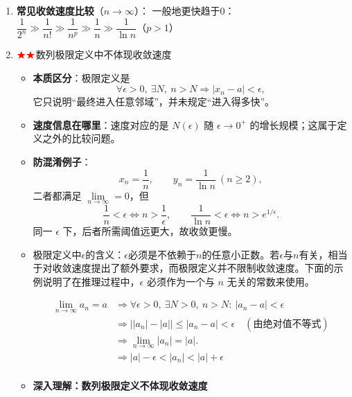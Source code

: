 \documentclass[../book.tex]{subfiles}
\begin{document}
\begin{enumerate}
        \item \textbf{常见收敛速度比较}（$n\to\infty$）：
        一般地更快趋于$0$：$\dfrac{1}{2^n} \gg \dfrac{1}{n!} \gg \dfrac{1}{n^p} \gg \dfrac{1}{n} \gg \dfrac{1}{\ln n}$（$p > 1$）
        \item $\color{red}{\bigstar}\color{red}{\bigstar}$数列极限定义中不体现收敛速度
        \begin{itemize}
            \item \textbf{本质区分}：极限定义是
            \[
                \forall \epsilon>0,\ \exists N,\ n>N\Rightarrow |x_n-a|<\epsilon,
            \]
            它只说明“最终进入任意邻域”，并未规定“进入得多快”。
            \item \textbf{速度信息在哪里}：速度对应的是 $N(\epsilon)$ 随 $\epsilon\to0^+$ 的增长规模；这属于定义之外的比较问题。
            \item \textbf{防混淆例子}：
            \[
                x_n=\frac1n,\qquad y_n=\frac1{\ln n}\ (n\ge2),
            \]
            二者都满足 $\lim\limits_{n\to\infty}=0$，但
            \[
                \frac1n<\epsilon \iff n>\frac1\epsilon,\qquad
                \frac1{\ln n}<\epsilon \iff n>e^{1/\epsilon}.
            \]
            同一 $\epsilon$ 下，后者所需阈值远更大，故收敛更慢。
            \item 极限定义中$\epsilon$的含义：$\epsilon$必须是不依赖于$n$的任意小正数。若$\epsilon$与$n$有关，相当于对收敛速度提出了额外要求，而极限定义并不限制收敛速度。下面的示例说明了在推理过程中，$\epsilon$ 必须作为一个与 $n$ 无关的常数来使用。
            \begin{analysisbox}[示例]
                \[
                    \begin{aligned}
                        \lim_{n \to \infty} a_n = a
                        &\Rightarrow \forall \epsilon > 0,\ \exists N > 0,\ n > N:\ |a_n - a| < \epsilon \\[4pt]
                        &\Rightarrow \bigl||a_n| - |a|\bigr| \le |a_n - a| < \epsilon
                        \quad (\text{由绝对值不等式}) \\[4pt]
                        &\Rightarrow \lim_{n \to \infty} |a_n| = |a|. \\[4pt]
                        &\Rightarrow |a| - \epsilon < |a_n| < |a| + \epsilon \\[4pt]
                    \end{aligned}
                \]
            \end{analysisbox}
            \item \textbf{深入理解：数列极限定义不体现收敛速度}

\end{itemize}
\end{enumerate}
\end{document}

